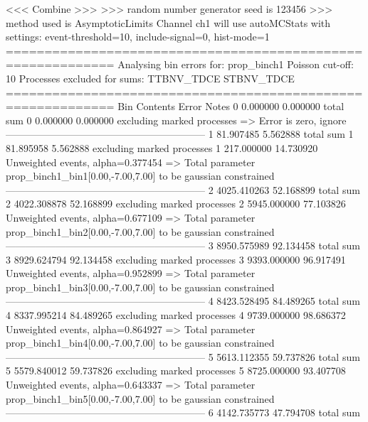  <<< Combine >>> 
>>> random number generator seed is 123456
>>> method used is AsymptoticLimits
Channel ch1 will use autoMCStats with settings: event-threshold=10, include-signal=0, hist-mode=1
============================================================
Analysing bin errors for: prop_binch1
Poisson cut-off: 10
Processes excluded for sums: TTBNV_TDCE STBNV_TDCE
============================================================
Bin        Contents        Error           Notes                         
0          0.000000        0.000000        total sum                     
0          0.000000        0.000000        excluding marked processes    
  => Error is zero, ignore      
------------------------------------------------------------
1          81.907485       5.562888        total sum                     
1          81.895958       5.562888        excluding marked processes    
1          217.000000      14.730920       Unweighted events, alpha=0.377454
  => Total parameter prop_binch1_bin1[0.00,-7.00,7.00] to be gaussian constrained
------------------------------------------------------------
2          4025.410263     52.168899       total sum                     
2          4022.308878     52.168899       excluding marked processes    
2          5945.000000     77.103826       Unweighted events, alpha=0.677109
  => Total parameter prop_binch1_bin2[0.00,-7.00,7.00] to be gaussian constrained
------------------------------------------------------------
3          8950.575989     92.134458       total sum                     
3          8929.624794     92.134458       excluding marked processes    
3          9393.000000     96.917491       Unweighted events, alpha=0.952899
  => Total parameter prop_binch1_bin3[0.00,-7.00,7.00] to be gaussian constrained
------------------------------------------------------------
4          8423.528495     84.489265       total sum                     
4          8337.995214     84.489265       excluding marked processes    
4          9739.000000     98.686372       Unweighted events, alpha=0.864927
  => Total parameter prop_binch1_bin4[0.00,-7.00,7.00] to be gaussian constrained
------------------------------------------------------------
5          5613.112355     59.737826       total sum                     
5          5579.840012     59.737826       excluding marked processes    
5          8725.000000     93.407708       Unweighted events, alpha=0.643337
  => Total parameter prop_binch1_bin5[0.00,-7.00,7.00] to be gaussian constrained
------------------------------------------------------------
6          4142.735773     47.794708       total sum                     
